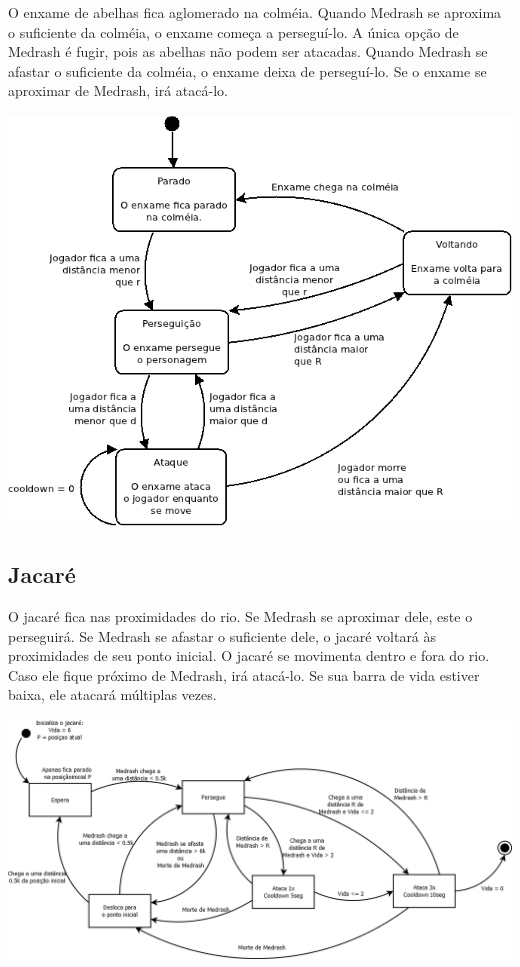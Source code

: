 O enxame de abelhas fica aglomerado na colméia. Quando Medrash se
aproxima o suficiente da colméia, o enxame começa a perseguí-lo.
A única opção de Medrash é fugir, pois as abelhas não podem ser atacadas.
Quando Medrash se afastar o suficiente da colméia, o enxame deixa
de perseguí-lo.
Se o enxame se aproximar de Medrash, irá atacá-lo.

\begin{center}
 \includegraphics[scale=0.7]{ia_enxame.png}
\end{center}

\subsection{Jacaré}

O jacaré fica nas proximidades do rio. Se Medrash se aproximar dele,
este o perseguirá. Se Medrash se afastar o suficiente dele, o jacaré voltará às proximidades de seu ponto inicial.
O jacaré se movimenta dentro e fora do rio. Caso ele fique próximo de
Medrash, irá atacá-lo. Se sua barra de vida estiver baixa, ele atacará
múltiplas vezes.

\begin{center}
 \includegraphics[scale=0.4]{ia_jacare.png}
\end{center}

